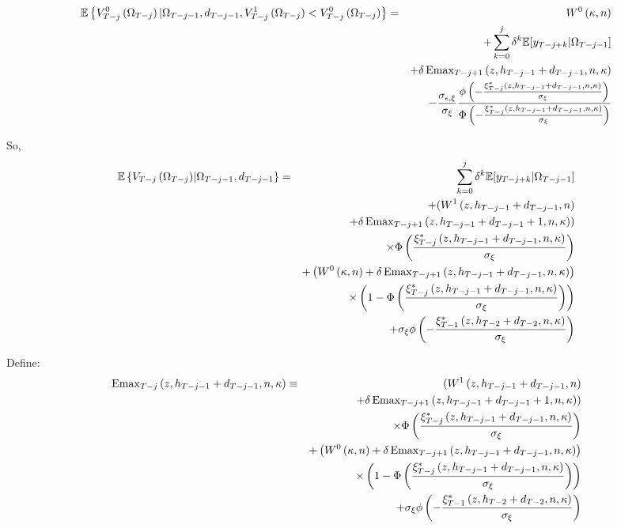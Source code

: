 \begin{eqnarray}
\mathbb{E} \left\{ V^{0}_{T-j}\left(\Omega_{T-j}\right) | \Omega_{T-j-1}, d_{T-j-1}, V^{1}_{T-j}\left(\Omega_{T-j}\right) < V^{0}_{T-j}\left(\Omega_{T-j}\right) \right\}
&=& W^0\left(\kappa, n \right) \nonumber \\
& & + \sum_{k=0}^{j} \delta^{k} \mathbb{E} [y_{T-j+k} | \Omega_{T-j-1}] \nonumber \\
& & + \delta \operatorname{Emax}_{T-j+1} \left(z, h_{T-j-1} + d_{T-j-1}, n, \kappa \right) \nonumber \\
& & - \frac{\sigma_{\epsilon, \xi}}{\sigma_\xi} \frac{\phi\left(-\frac{\xi^*_{T-j}\left(z, h_{T-j-1}+d_{T-j-1},n,\kappa\right)}{\sigma_\xi}\right)}{\Phi\left(-\frac{\xi^*_{T-j}\left(z, h_{T-j-1}+d_{T-j-1}, n, \kappa \right)}{\sigma_\xi}\right)}
\end{eqnarray} 

\indent So,
\begin{eqnarray}
\mathbb{E} \left\{ V_{T-j}\left(\Omega_{T-j}\right) \middle| \Omega_{T-j-1}, d_{T-j-1}\right\} &=& \sum_{k=0}^{j} \delta^{k} \mathbb{E} [y_{T-j+k} | \Omega_{T-j-1}] \nonumber \\
& & + ( W^{1} \left(z, h_{T-j-1} + d_{T-j-1}, n \right) \nonumber \\
& & + \delta \operatorname{Emax}_{T-j+1} \left(z, h_{T-j-1} + d_{T-j-1} + 1, n, \kappa \right) ) \nonumber \\
& & \times \Phi \left(\frac{\xi^*_{T-j}\left(z, h_{T-j-1}+d_{T-j-1}, n, \kappa \right)}{\sigma_\xi}\right) \nonumber \\
& & + \left( W^0\left(\kappa, n \right) + \delta \operatorname{Emax}_{T-j+1} \left(z, h_{T-j-1} + d_{T-j-1}, n, \kappa \right) \right) \nonumber \\
& & \times \left( 1- \Phi \left(\frac{\xi^*_{T-j}\left(z, h_{T-j-1}+d_{T-j-1}, n, \kappa \right)}{\sigma_\xi}\right) \right) \nonumber \\
& & + \sigma_\xi \phi \left(-\frac{\xi^*_{T-1}\left(z, h_{T-2}+d_{T-2}, n, \kappa \right)}{\sigma_\xi}\right) 
\end{eqnarray}

\indent Define:
\begin{eqnarray}
\operatorname{Emax}_{T-j} \left( z, h_{T-j-1}+d_{T-j-1}, n, \kappa \right) & \equiv & ( W^{1} \left(z, h_{T-j-1} + d_{T-j-1}, n \right) \nonumber \\
& & + \delta \operatorname{Emax}_{T-j+1} \left(z, h_{T-j-1} + d_{T-j-1} + 1, n, \kappa \right) ) \nonumber \\
& & \times \Phi \left(\frac{\xi^*_{T-j}\left(z, h_{T-j-1}+d_{T-j-1}, n, \kappa \right)}{\sigma_\xi}\right) \nonumber \\
& & + \left( W^0\left(\kappa, n \right) + \delta \operatorname{Emax}_{T-j+1} \left(z, h_{T-j-1} + d_{T-j-1}, n, \kappa \right) \right) \nonumber \\
& & \times \left( 1- \Phi \left(\frac{\xi^*_{T-j}\left(z, h_{T-j-1}+d_{T-j-1}, n, \kappa \right)}{\sigma_\xi}\right) \right) \nonumber \\
& & + \sigma_\xi \phi \left(-\frac{\xi^*_{T-1}\left(z, h_{T-2}+d_{T-2}, n, \kappa \right)}{\sigma_\xi}\right)
\end{eqnarray}


